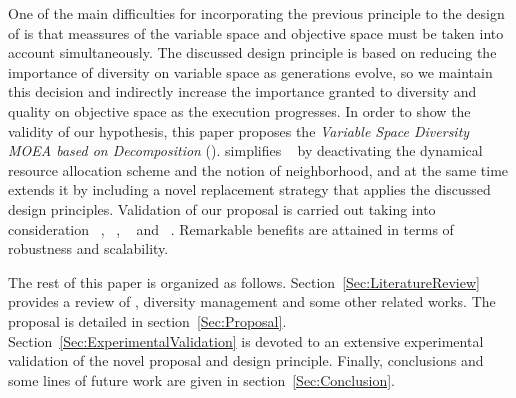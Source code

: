 One of the main difficulties for incorporating the previous principle to the design of \MOEAS{} is that
meassures of the variable space and objective space must be taken into account simultaneously.
%
The discussed design principle is based on reducing the importance of diversity on variable space as 
generations evolve, so we maintain this decision and indirectly increase the importance granted to diversity 
and quality on objective space as the execution progresses.
%
%
In order to show the validity of our hypothesis, this paper proposes the
\textit{Variable Space Diversity MOEA based on Decomposition} (\VSDMOEAD{}).
%
\VSDMOEAD{} simplifies \MOEADDE{}~\cite{zhang2009performance} by deactivating the dynamical resource allocation
scheme and the notion of neighborhood,
and at the same
time extends it by including a novel replacement strategy that applies the discussed design principles.
%
Validation of our proposal is carried out taking into consideration 
\MOEADDE{}~\cite{zhang2009performance}, 
\NSGAII{}~\cite{deb2002fast}, 
\REMOA{}~\cite{trautmann2013r2} and 
\NSGAIII{}~\cite{deb2013evolutionary}.
%
Remarkable benefits are attained in terms of robustness and scalability.

The rest of this paper is organized as follows.
%
Section~\ref{Sec:LiteratureReview} provides a review of \MOEAS{}, diversity management 
and some other related works.
%
The \VSDMOEAD{} proposal is detailed in section~\ref{Sec:Proposal}.
%
Section~\ref{Sec:ExperimentalValidation} is devoted to an extensive experimental validation of the novel proposal and
design principle.
%
Finally, conclusions and some lines of future work are given in section~\ref{Sec:Conclusion}.
%
